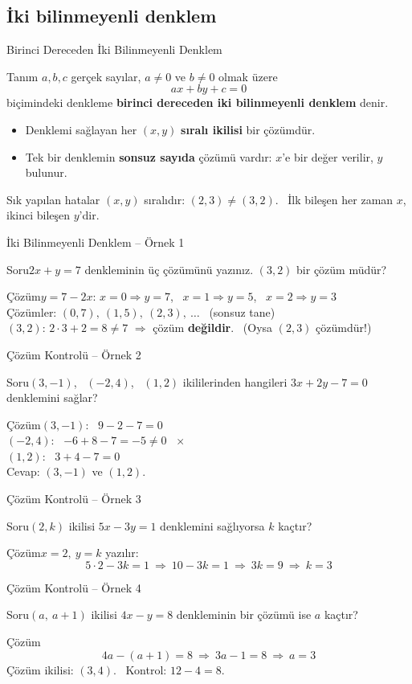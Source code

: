 \documentclass[aspectratio=169,11pt]{beamer}
\newcommand{\soru}[3]{%
\begin{frame}{#1}
  \begin{block}{Soru}\large #2\end{block}
  \pause
  \begin{exampleblock}{Çözüm}\large #3\end{exampleblock}
\end{frame}}
\begin{document}
\subsection{İki bilinmeyenli denklem}
\begin{frame}{Birinci Dereceden İki Bilinmeyenli Denklem}
\begin{block}{Tanım}
\(a,b,c\) gerçek sayılar, \(a\neq 0\) ve \(b\neq 0\) olmak üzere
\[ax+by+c=0\]
biçimindeki denkleme \textbf{birinci dereceden iki bilinmeyenli denklem} denir.
\begin{itemize}
\item Denklemi sağlayan her \((x,y)\) \textbf{sıralı ikilisi} bir çözümdür.
\item Tek bir denklemin \textbf{sonsuz sayıda} çözümü vardır: \(x\)'e bir değer verilir, \(y\) bulunur.
\end{itemize}
\end{block}
\begin{alertblock}{Sık yapılan hatalar}
\((x,y)\) sıralıdır: \((2,3)\neq(3,2)\). \ İlk bileşen her zaman \(x\), ikinci bileşen \(y\)'dir.
\end{alertblock}
\end{frame}

\soru{İki Bilinmeyenli Denklem -- Örnek 1}
{\(2x+y=7\) denkleminin üç çözümünü yazınız. \((3,2)\) bir çözüm müdür?}
{\(y=7-2x\): \quad \(x=0\Rightarrow y=7\), \ \(x=1\Rightarrow y=5\), \ \(x=2\Rightarrow y=3\)\\[3pt]
Çözümler: \((0,7),\ (1,5),\ (2,3),\ \dots\) \ (sonsuz tane)\\[3pt]
\((3,2)\): \(2\cdot 3+2=8\neq 7\) \(\Rightarrow\) çözüm \textbf{değildir}. \ (Oysa \((2,3)\) çözümdür!)}

\soru{Çözüm Kontrolü -- Örnek 2}
{\((3,-1)\), \ \((-2,4)\), \ \((1,2)\) ikililerinden hangileri \(3x+2y-7=0\) denklemini sağlar?}
{\((3,-1)\): \ \(9-2-7=0\) \ \checkmark\\[2pt]
\((-2,4)\): \ \(-6+8-7=-5\neq 0\) \ \(\times\)\\[2pt]
\((1,2)\): \ \(3+4-7=0\) \ \checkmark\\[4pt]
Cevap: \((3,-1)\) ve \((1,2)\).}

\soru{Çözüm Kontrolü -- Örnek 3}
{\((2,k)\) ikilisi \(5x-3y=1\) denklemini sağlıyorsa \(k\) kaçtır?}
{\(x=2,\ y=k\) yazılır:
\[5\cdot 2-3k=1\ \Rightarrow\ 10-3k=1\ \Rightarrow\ 3k=9\ \Rightarrow\ k=3\]}

\soru{Çözüm Kontrolü -- Örnek 4}
{\((a,\ a+1)\) ikilisi \(4x-y=8\) denkleminin bir çözümü ise \(a\) kaçtır?}
{\[4a-(a+1)=8\ \Rightarrow\ 3a-1=8\ \Rightarrow\ a=3\]
Çözüm ikilisi: \((3,4)\). \ Kontrol: \(12-4=8\).}
\end{document}
